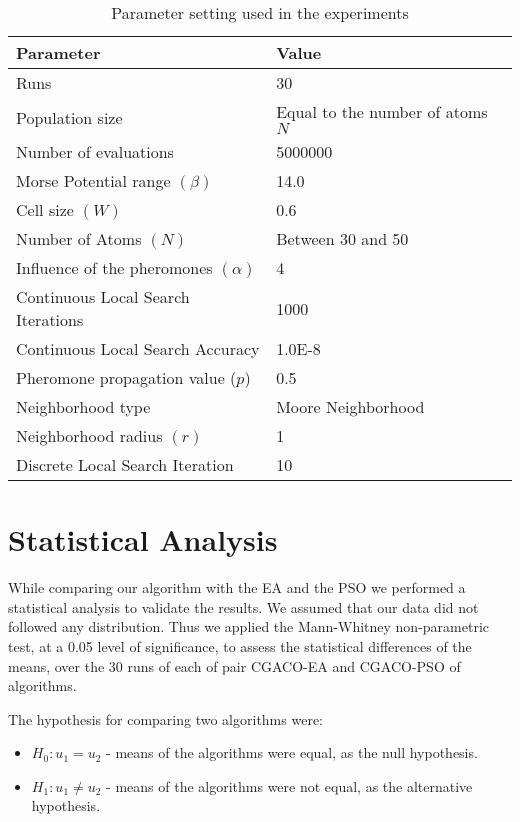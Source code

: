 \begin{table}[!htbp]
	\begin{center}
		\begin{tabular}{| l | p{8cm} |}
			\hline
			\textbf{Parameter} & \textbf{Value} \\ \hline
			Runs & 30 \\
			Population size & Equal to the number of atoms $N$\\
			Number of evaluations & 5000000 \\
			Morse Potential range $(\beta)$ & 14.0 \\ 
			Cell size $(W)$ & 0.6 \\
			Number of Atoms $(N)$ & Between 30 and 50 \\
			Influence of the pheromones $(\alpha)$ & 4 \\
			Continuous Local Search Iterations & 1000\\
			Continuous Local Search Accuracy & 1.0E-8\\
			Pheromone propagation value ($p$) & 0.5 \\
			Neighborhood type & Moore Neighborhood \\
			Neighborhood radius $(r)$ & 1 \\
			Discrete Local Search Iteration & 10 \\
			\hline
		\end{tabular}
	\caption{Parameter setting used in the experiments}
	\label{tab:general_settings}
	\end{center}
\end{table}
\pagebreak

\section{Statistical Analysis}
While comparing our algorithm with the EA and the PSO we performed a statistical analysis to validate the results. We assumed that our data did not followed any distribution. Thus we applied the Mann-Whitney non-parametric test, at a 0.05 level of significance, to assess the statistical differences of the means, over the 30 runs of each of pair CGACO-EA and CGACO-PSO of algorithms.

The hypothesis for comparing two algorithms were:
\begin{itemize}
	\item $H_{0} : u_1 = u_2$ - means of the algorithms were equal, as the null hypothesis.
	\item $H_{1} : u_1 \neq u_2$ - means of the algorithms were not equal, as the alternative hypothesis.
\end{itemize}

